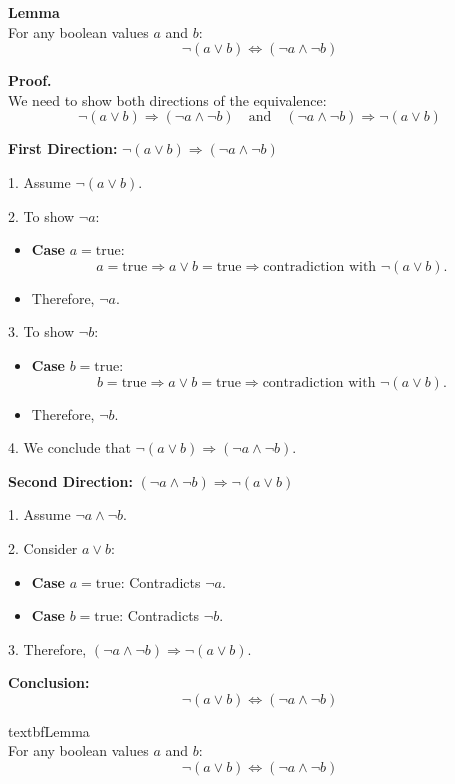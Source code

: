 \textbf{Lemma} \\[5pt]
For any boolean values \( a \) and \( b \):
\[
\neg (a \lor b) \Leftrightarrow (\neg a \land \neg b)
\]

\textbf{Proof.} \\[5pt]
We need to show both directions of the equivalence:
\[
\neg (a \lor b) \Rightarrow (\neg a \land \neg b) \quad \text{and} \quad (\neg a \land \neg b) \Rightarrow \neg (a \lor b)
\]

\textbf{First Direction:} \( \neg (a \lor b) \Rightarrow (\neg a \land \neg b) \)

1. Assume \( \neg (a \lor b) \).

2. To show \( \neg a \):
\begin{itemize}
	\item \textbf{Case} \( a = \text{true} \):
	\[
	a = \text{true} \Rightarrow a \lor b = \text{true} \Rightarrow \text{contradiction with } \neg (a \lor b).
	\]
	\item Therefore, \( \neg a \).
\end{itemize}

3. To show \( \neg b \):
\begin{itemize}
	\item \textbf{Case} \( b = \text{true} \):
	\[
	b = \text{true} \Rightarrow a \lor b = \text{true} \Rightarrow \text{contradiction with } \neg (a \lor b).
	\]
	\item Therefore, \( \neg b \).
\end{itemize}

4. We conclude that \( \neg (a \lor b) \Rightarrow (\neg a \land \neg b) \).

\textbf{Second Direction:} \( (\neg a \land \neg b) \Rightarrow \neg (a \lor b) \)

1. Assume \( \neg a \land \neg b \).

2. Consider \( a \lor b \):
\begin{itemize}
	\item \textbf{Case} \( a = \text{true} \): Contradicts \( \neg a \).
	\item \textbf{Case} \( b = \text{true} \): Contradicts \( \neg b \).
\end{itemize}

3. Therefore, \( (\neg a \land \neg b) \Rightarrow \neg (a \lor b) \).

\textbf{Conclusion:}
\[
\neg (a \lor b) \Leftrightarrow (\neg a \land \neg b)
\]

textbf{Lemma} \\[5pt]
For any boolean values \( a \) and \( b \):
\[
\neg (a \lor b) \Leftrightarrow (\neg a \land \neg b)
\]

